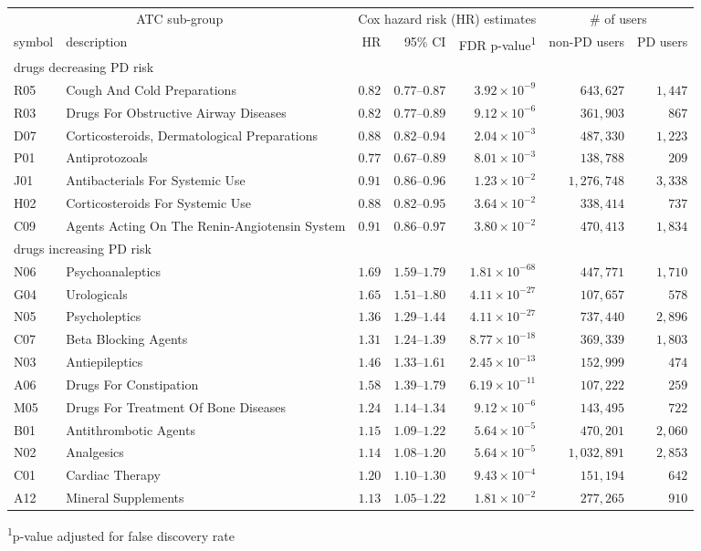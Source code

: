 \setlength{\LTpost}{0mm}
\begin{longtable}{llrrrrr}
\toprule
\multicolumn{2}{c}{ATC sub-group} & \multicolumn{3}{c}{Cox hazard risk (HR) estimates} & \multicolumn{2}{c}{\# of users} \\ 
\cmidrule(lr){1-2} \cmidrule(lr){3-5} \cmidrule(lr){6-7}
symbol & description & HR & 95\% CI & FDR p-value\textsuperscript{1} & non-PD users & PD users \\ 
\midrule
\multicolumn{7}{l}{drugs decreasing PD risk} \\ 
\midrule
R05 & Cough And Cold Preparations & $0.82$ & $0.77$–$0.87$ & $3.92 \times 10^{-9}$ & $643,627$ & $1,447$ \\ 
R03 & Drugs For Obstructive Airway Diseases & $0.82$ & $0.77$–$0.89$ & $9.12 \times 10^{-6}$ & $361,903$ & $867$ \\ 
D07 & Corticosteroids, Dermatological Preparations & $0.88$ & $0.82$–$0.94$ & $2.04 \times 10^{-3}$ & $487,330$ & $1,223$ \\ 
P01 & Antiprotozoals & $0.77$ & $0.67$–$0.89$ & $8.01 \times 10^{-3}$ & $138,788$ & $209$ \\ 
J01 & Antibacterials For Systemic Use & $0.91$ & $0.86$–$0.96$ & $1.23 \times 10^{-2}$ & $1,276,748$ & $3,338$ \\ 
H02 & Corticosteroids For Systemic Use & $0.88$ & $0.82$–$0.95$ & $3.64 \times 10^{-2}$ & $338,414$ & $737$ \\ 
C09 & Agents Acting On The Renin-Angiotensin System & $0.91$ & $0.86$–$0.97$ & $3.80 \times 10^{-2}$ & $470,413$ & $1,834$ \\ 
\midrule
\multicolumn{7}{l}{drugs increasing PD risk} \\ 
\midrule
N06 & Psychoanaleptics & $1.69$ & $1.59$–$1.79$ & $1.81 \times 10^{-68}$ & $447,771$ & $1,710$ \\ 
G04 & Urologicals & $1.65$ & $1.51$–$1.80$ & $4.11 \times 10^{-27}$ & $107,657$ & $578$ \\ 
N05 & Psycholeptics & $1.36$ & $1.29$–$1.44$ & $4.11 \times 10^{-27}$ & $737,440$ & $2,896$ \\ 
C07 & Beta Blocking Agents & $1.31$ & $1.24$–$1.39$ & $8.77 \times 10^{-18}$ & $369,339$ & $1,803$ \\ 
N03 & Antiepileptics & $1.46$ & $1.33$–$1.61$ & $2.45 \times 10^{-13}$ & $152,999$ & $474$ \\ 
A06 & Drugs For Constipation & $1.58$ & $1.39$–$1.79$ & $6.19 \times 10^{-11}$ & $107,222$ & $259$ \\ 
M05 & Drugs For Treatment Of Bone Diseases & $1.24$ & $1.14$–$1.34$ & $9.12 \times 10^{-6}$ & $143,495$ & $722$ \\ 
B01 & Antithrombotic Agents & $1.15$ & $1.09$–$1.22$ & $5.64 \times 10^{-5}$ & $470,201$ & $2,060$ \\ 
N02 & Analgesics & $1.14$ & $1.08$–$1.20$ & $5.64 \times 10^{-5}$ & $1,032,891$ & $2,853$ \\ 
C01 & Cardiac Therapy & $1.20$ & $1.10$–$1.30$ & $9.43 \times 10^{-4}$ & $151,194$ & $642$ \\ 
A12 & Mineral Supplements & $1.13$ & $1.05$–$1.22$ & $1.81 \times 10^{-2}$ & $277,265$ & $910$ \\ 
\bottomrule
\end{longtable}
\begin{minipage}{\linewidth}
\textsuperscript{1}p-value adjusted for false discovery rate\\
\end{minipage}

